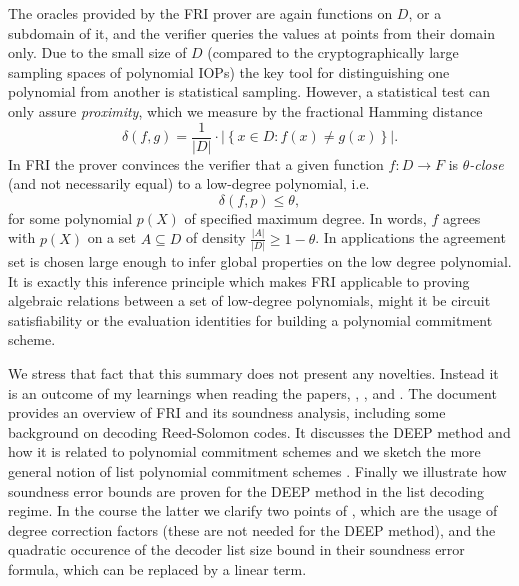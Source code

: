 \documentclass[11pt,article,oneside]{memoir}
\theoremstyle{definition}
\theoremstyle{remark}
\begin{document}
The oracles provided by the FRI prover are again functions on $D$, or a subdomain of it, and the verifier queries the values at points from their domain only.
Due to the small size of $D$ (compared to the cryptographically large sampling spaces of polynomial IOPs) the key tool for distinguishing one  polynomial from another is statistical sampling. 
However, a statistical test can only assure \textit{proximity}, which we measure by the fractional Hamming distance
\begin{equation*}
\delta(f, g) = \frac{1}{|D|}\cdot \big|\left\{x\in D: f(x)\neq g(x)\right\}\big|.
\end{equation*}
In FRI the prover convinces the verifier that a given function $f: D\longrightarrow F$ is \textit{$\theta$-close} (and not necessarily equal) to a low-degree polynomial, i.e.
\begin{equation*}
\delta(f, p) \leq \theta,
\end{equation*}
for some polynomial $p(X)$ of specified maximum degree.
In words, $f$ agrees with $p(X)$ on a set $A\subseteq D$ of density $\frac{|A|}{|D|} \geq 1-\theta$. 
In applications the agreement set is chosen large enough to infer global properties on the low degree polynomial. 
It is exactly this inference principle which makes FRI applicable to proving algebraic relations between a set of low-degree polynomials, might it be circuit satisfiability or the evaluation identities for building a polynomial commitment scheme.


We stress that fact that this summary does not present any novelties.
Instead it is an outcome of my learnings when reading the papers\cite{ProximityGaps}, \cite{DEEPFRI}, \cite{FRI}, \cite{Redshift} and \cite{ethSTARK}. 
The document provides an overview of FRI and its soundness analysis, including some background on decoding Reed-Solomon codes.
It discusses the DEEP method and how it is related to polynomial commitment schemes and we sketch the more general notion of list polynomial commitment schemes \cite{Redshift}. 
Finally we illustrate how soundness error bounds are proven for the DEEP method in the list decoding regime. 
In the course the latter we clarify two points of \cite{ethSTARK}, which are the usage of degree correction factors (these are not needed for the DEEP method), and the quadratic occurence of the decoder list size bound in their soundness error formula, which can be replaced by a linear term.   
\end{document}
